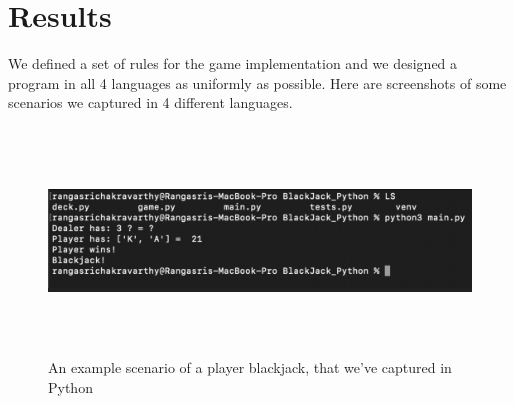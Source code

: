 \documentclass[12pt]{article}
\begin{document}
\section{Results}

We defined a set of rules for the game implementation and we designed a program in all 4 languages as uniformly as possible. Here are screenshots of some scenarios we captured in 4 different languages. 

\begin{figure}[h!]
\centering
\includegraphics[height=6cm, width=15cm]{Python.png}
\caption{An example scenario of a player blackjack, that we've captured in Python}
\end{figure}

\pagebreak
\end{document}
